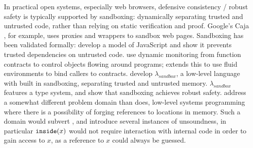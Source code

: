 In practical open systems, especially web browsers, defensive
consistency / robust safety is typically supported by sandboxing: dynamically separating
trusted and untrusted code, rather than relying on static verification
and proof.
Google's Caja \cite{Caja}, for example, uses proxies and wrappers to
sandbox web pages.
Sandboxing has been validated
formally:  \cite{mmt-oakland10} develop a model of
JavaScript and show it prevents trusted dependencies on untrusted code.
%
\cite{DPCC14} use dynamic monitoring from function contracts to
control objects flowing around programs; 
\cite{AuthContract} extends this to use fluid 
environments to bind callers to contracts.
%
\cite{sandbox} develop $\lambda_{sandbox}$, a low-level language with 
built in sandboxing, separating trusted and
untrusted memory. $\lambda_{sandbox}$ features a type system,
and \citeauthor{sandbox} show that sandboxing achieves robust safety.
\citeauthor{sandbox} address a somewhat different
problem domain than \Nec does, low-level systems programming where 
there is a possibility of forging references to locations in memory. Such a domain
would subvert \Nec, and introduce several instances of unsoundness, in particular
$\texttt{inside}( x )$ would not require interaction with internal code in order to 
gain access to $x$, as a reference to $x$ could always be guessed.


